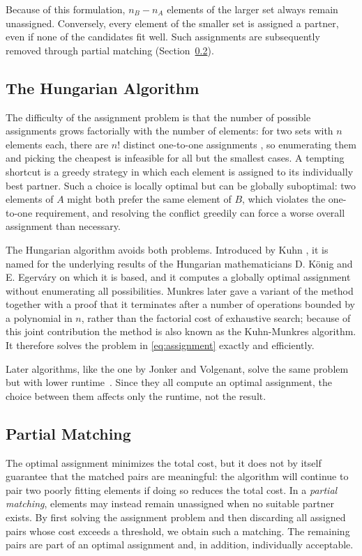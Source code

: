 \documentclass[english, egger, bsc]{vcethesis}
\begin{document}
Because of this formulation, $n_B -n_A$ elements of the larger set always remain unassigned. Conversely, every element of the smaller set is assigned a partner, even if none of the candidates fit well. Such assignments are subsequently removed through partial matching (Section~\ref{sec:partial_matching}).
\subsection{The Hungarian Algorithm}
The difficulty of the assignment problem is that the number of possible assignments grows factorially with the number of elements: for two sets with $n$ elements each, there are $n!$ distinct one-to-one assignments \cite{munkres1957algorithms}, so enumerating them and picking the cheapest is infeasible for all but the smallest cases. A tempting shortcut is a greedy strategy in which each element is assigned to its individually best partner. Such a choice is locally optimal but can be globally suboptimal: two elements of $A$ might both prefer the same element of $B$, which violates the one-to-one requirement, and resolving the conflict greedily can force a worse overall assignment than necessary.

The Hungarian algorithm avoids both problems. Introduced by Kuhn \cite{kuhn1955hungarian}, it is named for the underlying results of the Hungarian mathematicians D. König and E. Egerv\'ary on which it is based, and it computes a globally optimal assignment without enumerating all possibilities. Munkres \cite{munkres1957algorithms} later gave a variant of the method together with a proof that it terminates after a number of operations bounded by a polynomial in $n$, rather than the factorial cost of exhaustive search; because of this joint contribution the method is also known as the Kuhn-Munkres algorithm. It therefore solves the problem in \eqref{eq:assignment} exactly and efficiently.

Later algorithms, like the one by Jonker and Volgenant, solve the same problem but with lower runtime~\cite{crouse2016}. Since they all compute an optimal assignment, the choice between them affects only the runtime, not the result.

\subsection{Partial Matching}
\label{sec:partial_matching}
The optimal assignment minimizes the total cost, but it does not by itself guarantee that the matched pairs are meaningful: the algorithm will continue to pair two poorly fitting elements if doing so reduces the total cost. In a \emph{partial matching}, elements may instead remain unassigned when no suitable partner exists. By first solving the assignment problem and then discarding all assigned pairs whose cost exceeds a threshold, we obtain such a matching. The remaining pairs are part of an optimal assignment and, in addition, individually acceptable.
\end{document}
